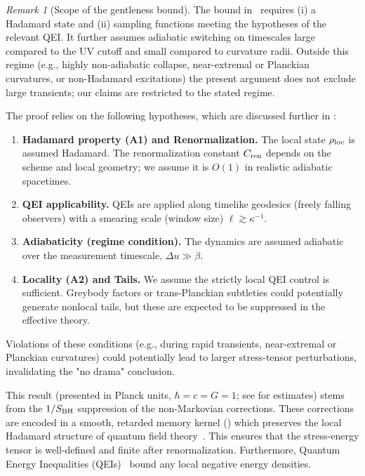 \documentclass[a4paper,11pt]{article}
\newcommand{\eg}{e.g.\xspace}
\theoremstyle{plain}
\theoremstyle{definition}
\theoremstyle{remark}
\newtheorem{remark}{Remark}
\begin{document}
\begin{remark}[Scope of the gentleness bound]
The bound in~ requires (i) a Hadamard state and (ii) sampling functions meeting the hypotheses of the relevant QEI. It further assumes adiabatic switching on timescales large compared to the UV cutoff and small compared to curvature radii. Outside this regime (\eg, highly non-adiabatic collapse, near-extremal or Planckian curvatures, or non-Hadamard excitations) the present argument does not exclude large transients; our claims are restricted to the stated regime.

The proof relies on the following hypotheses, which are discussed further in :
\begin{enumerate}[label=(\roman*)]
    \item \textbf{Hadamard property (A1) and Renormalization.} The local state $\rho_{\rm loc}$ is assumed Hadamard. The renormalization constant $C_{\rm ren}$ depends on the scheme and local geometry; we assume it is $O(1)$ in realistic adiabatic spacetimes.
    \item \textbf{QEI applicability.} QEIs are applied along timelike geodesics (freely falling observers) with a smearing scale (window size) $\ell \gtrsim \kappa^{-1}$.
    \item \textbf{Adiabaticity (regime condition).} The dynamics are assumed adiabatic over the measurement timescale, $\Delta u \gg \beta$.
    \item \textbf{Locality (A2) and Tails.} We assume the strictly local QEI control is sufficient. Greybody factors or trans-Planckian subtleties could potentially generate nonlocal tails, but these are expected to be suppressed in the effective theory.
\end{enumerate}
Violations of these conditions (\eg, during rapid transients, near-extremal or Planckian curvatures) could potentially lead to larger stress-tensor perturbations, invalidating the "no drama" conclusion.
\end{remark}

This result (presented in Planck units, $\hbar=c=G=1$; see  for estimates) stems from the $1/S_{\rm BH}$ suppression of the non-Markovian corrections. These corrections are encoded in a smooth, retarded memory kernel () which preserves the local Hadamard structure of quantum field theory~\cite{Radzikowski:1996}. This ensures that the stress-energy tensor is well-defined and finite after renormalization. Furthermore, Quantum Energy Inequalities (QEIs)~\cite{Fewster:2012} bound any local negative energy densities.
\end{document}

